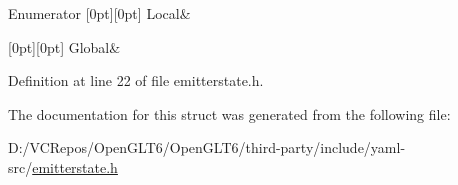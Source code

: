 \begin{DoxyEnumFields}{Enumerator}
[0pt][0pt]{}\mbox{\label{struct_y_a_m_l_1_1_fmt_scope_a58c967eadfafdc79f62cd5c59ec2b1fea50fd74375e1d5cfdb9afacb58e750a86}} 
Local&\\
\hline

[0pt][0pt]{}\mbox{\label{struct_y_a_m_l_1_1_fmt_scope_a58c967eadfafdc79f62cd5c59ec2b1fea135a8cbbd9569fc49ed1044e10748cfd}} 
Global&\\
\hline

\end{DoxyEnumFields}


Definition at line 22 of file emitterstate.\+h.



The documentation for this struct was generated from the following file\+:\begin{DoxyCompactItemize}
\item 
D\+:/\+V\+C\+Repos/\+Open\+G\+L\+T6/\+Open\+G\+L\+T6/third-\/party/include/yaml-\/src/\mbox{\hyperlink{emitterstate_8h}{emitterstate.\+h}}\end{DoxyCompactItemize}
